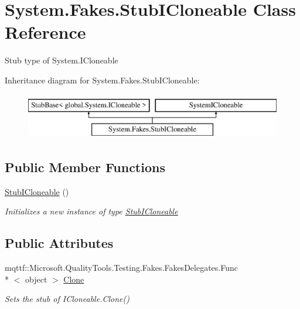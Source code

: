 \hypertarget{class_system_1_1_fakes_1_1_stub_i_cloneable}{\section{System.\-Fakes.\-Stub\-I\-Cloneable Class Reference}
\label{class_system_1_1_fakes_1_1_stub_i_cloneable}
}


Stub type of System.\-I\-Cloneable 


Inheritance diagram for System.\-Fakes.\-Stub\-I\-Cloneable\-:\begin{figure}[H]
\begin{center}
\leavevmode
\includegraphics[height=2.000000cm]{class_system_1_1_fakes_1_1_stub_i_cloneable}
\end{center}
\end{figure}
\subsection*{Public Member Functions}
\begin{DoxyCompactItemize}
\item 
\hyperlink{class_system_1_1_fakes_1_1_stub_i_cloneable_aa5321c9f5697e5e99aa638ee4c2be028}{Stub\-I\-Cloneable} ()
\begin{DoxyCompactList}\small\item\em Initializes a new instance of type \hyperlink{class_system_1_1_fakes_1_1_stub_i_cloneable}{Stub\-I\-Cloneable}\end{DoxyCompactList}\end{DoxyCompactItemize}
\subsection*{Public Attributes}
\begin{DoxyCompactItemize}
\item 
mqttf\-::\-Microsoft.\-Quality\-Tools.\-Testing.\-Fakes.\-Fakes\-Delegates.\-Func\\*
$<$ object $>$ \hyperlink{class_system_1_1_fakes_1_1_stub_i_cloneable_abdec5b8f10a732efac99633030707d83}{Clone}
\begin{DoxyCompactList}\small\item\em Sets the stub of I\-Cloneable.\-Clone()\end{DoxyCompactList}\end{DoxyCompactItemize}


